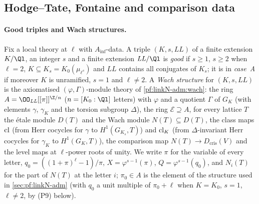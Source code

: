 \subsection{Hodge--Tate, Fontaine and comparison data}\label{pf:sh-hodge:hw}

\paragraph{Good triples and Wach structures.}
Fix a local theory at $\ell$ with $A_{\inf}$-data. A triple $(K,s,\mathit{LL})$ of a finite extension $K/\Ql$, an integer $s$ and a finite
extension $\mathit{LL}/\Ql$ is \emph{good} if $s\ge1$, $s\ge2$ when $\ell=2$, $K\subseteq K_s=K_0(\mu_{\ell^s})$ and $\mathit{LL}$ contains all
conjugates of $K_s$; it is in \emph{case~A} if moreover $K$ is unramified, $s=1$ and $\ell\ne2$. A \emph{Wach structure} for $(K,s,\mathit{LL})$ is the
axiomatised $(\varphi,\Gamma)$-module theory of \cref{pf:linkN-adm:wach}: the ring $A=\OO_{\mathit{LL}}[[\pi]]^{\Z/n}$ ($n=[K_0:\Ql]$ letters) with
$\varphi$ and a quotient $\Gamma$ of $G_K$ (with elements $\gamma$, $\gamma_K$ and the torsion subgroup $\Delta$), the ring $\mathcal E\supseteq A$,
for every lattice $T$ the \'etale module $D(T)$ and the Wach module $N(T)\subseteq D(T)$, the class maps $\operatorname{cl}$ (from Herr cocycles for
$\gamma$ to $H^1(G_{K_s},T)$) and $\operatorname{cl}_K$ (from $\Delta$-invariant Herr cocycles for $\gamma_K$ to $H^1(G_K,T)$), the comparison map
$N(T)\to D_{\mathrm{cris}}(V)$ and the level maps at $\ell$-power roots of unity. We write $\pi$ for the variable of every letter,
$q_0=((1+\pi)^\ell-1)/\pi$, $X=\varphi^{s-1}(\pi)$, $Q=\varphi^{s-1}(q_0)$, and $N_i(T)$ for the part of $N(T)$ at the letter $i$; $\pi_0\in A$ is
the element of the structure used in \cref{sec:pf:linkN-adm} (with $q_0$ a unit multiple of $\pi_0+\ell$ when $K=K_0$, $s=1$, $\ell\ne2$, by (P9)
below).

